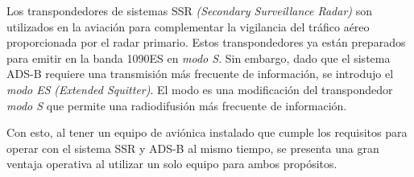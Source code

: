 \documentclass[a4paper, 11pt]{book}
\begin{document}
Los transpondedores de sistemas \textsc{SSR} \emph{(Secondary Surveillance Radar)} son utilizados en la aviación para complementar la vigilancia del tráfico aéreo proporcionada por el radar primario. Estos transpondedores ya están preparados para emitir en la banda \textsc{1090ES} en \emph{modo S}. Sin embargo, dado que el sistema \textsc{ADS-B} requiere una transmisión más frecuente de información, se introdujo el \emph{modo ES} \emph{(Extended Squitter)}. El modo es una modificación del transpondedor \emph{modo S} que permite una radiodifusión más frecuente de información.

Con esto, al tener un equipo de aviónica instalado que cumple los requisitos para operar con el sistema \textsc{SSR} y \textsc{ADS-B} al mismo tiempo, se presenta una gran ventaja operativa al utilizar un solo equipo para ambos propósitos.
\end{document}
